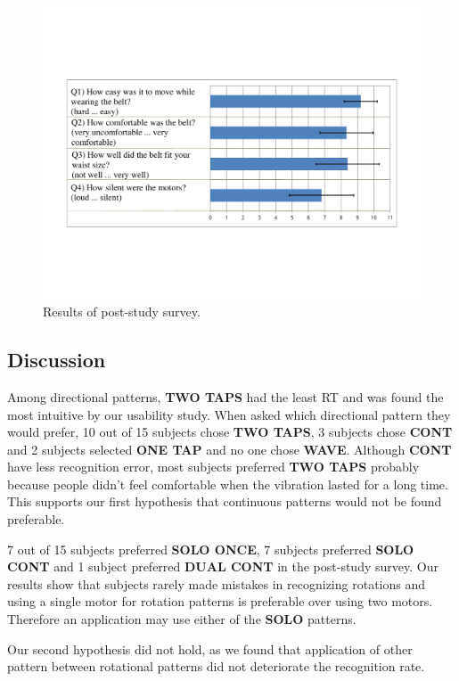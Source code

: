 \begin{figure}[ht!]
\centering
\includegraphics[trim=50 150 50 150,clip, width=1.0\textwidth]{pics/belt_survey}
\caption{Results of post-study survey.}
\label{fig:survey} 
\end{figure}

\subsection{Discussion}

Among directional patterns, \textbf{TWO TAPS} had the least RT and was found the most intuitive by our usability study. When asked which directional pattern they would prefer, 10 out of 15 subjects chose \textbf{TWO TAPS}, 3 subjects chose \textbf{CONT} and 2 subjects selected \textbf{ONE TAP} and no one chose \textbf{WAVE}. Although \textbf{CONT} have less recognition error, most subjects preferred \textbf{TWO TAPS} probably because people didn't feel comfortable when the vibration lasted for a long time. This supports our first hypothesis that continuous patterns would not be found preferable.

7 out of 15 subjects preferred \textbf{SOLO ONCE}, 7 subjects preferred \textbf{SOLO CONT} and 1 subject preferred \textbf{DUAL CONT} in the post-study survey. Our results show that subjects rarely made mistakes in recognizing rotations and using a single motor for rotation patterns is preferable over using two motors. Therefore an application may use either of the \textbf{SOLO} patterns. 

Our second hypothesis did not hold, as we found that application of other pattern between rotational patterns did not deteriorate the recognition rate.